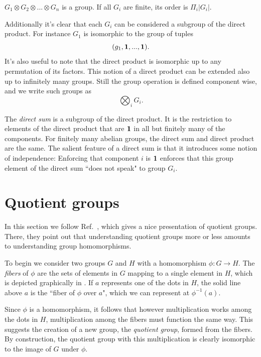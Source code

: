 \begin{proposition}{}{}
$G_1\otimes G_2\otimes ...\otimes G_n$ is a group.
If all $G_i$ are finite, its order is $\Pi_i |G_i|$.
\end{proposition}

Additionally it's clear that each $G_i$ can be considered
a subgroup of the direct product. For instance $G_1$ is
isomorphic to the group of tuples
\begin{equation}
(g_1,{\mathbf 1},...,{\mathbf 1}).
\end{equation}
It's also useful to note that the direct product is
isomorphic up to any permutation of its factors.
This notion of a direct product can be extended also
up to infinitely many groups. Still the group operation
is defined component wise, and we write such groups as
\begin{equation}
\bigotimes_i G_i.
\end{equation}

The {\it direct sum} is a subgroup
of the direct product. It is the restriction to elements of
the direct product that are ${\mathbf 1}$ in all but finitely
many of the components. For finitely many abelian groups,
the direct sum and direct product are the same. The
salient feature of a direct sum is that it introduces
some notion of independence: Enforcing that component $i$
is ${\mathbf 1}$ enforces that this group element of the
direct sum ``does not speak" to group $G_i$.


\section{Quotient groups}\label{sec:q}

In this section we follow Ref.~\cite{dummit_abstract_2004}, which gives a nice
presentation of quotient groups. There, they point out that understanding
quotient groups more or less amounts to understanding group homomorphisms.

To begin we consider two groups $G$ and $H$ with a homomorphism $\phi:G\to H$.
The {\it fibers} of $\phi$ are the sets of elements in $G$ mapping
to a single element in $H$, which is depicted graphically in
. If $a$ represents one of the dots in $H$,
the solid line above $a$ is the ``fiber of $\phi$ over $a$", which we can represent
at $\phi^{-1}(a)$.

Since $\phi$ is a homomorphism, it follows that however multiplication works 
among the dots in $H$, multiplication among the fibers must function the same
way. This suggests the creation of a new group, the {\it quotient group},
formed from the fibers. By construction, the quotient group with this
multiplication is clearly isomorphic to the image of $G$ under $\phi$.

